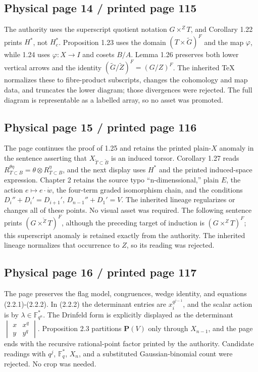 \documentclass[10pt]{article}
\begin{document}
\subsection*{Physical page 14 / printed page 115}

The authority uses the superscript quotient notation \(G\times^Z T\), and Corollary 1.22 prints \(H^*\), not \(H_c^*\). Proposition 1.23 uses the domain \((T\times\widetilde G)^F\) and the map \(\varphi\), while 1.24 uses \(\varphi:X\to I\) and cosets \(B/A\). Lemma 1.26 preserves both lower vertical arrows and the identity \((\widetilde G/\widetilde Z)^F=(G/Z)^F\). The inherited TeX normalizes these to fibre-product subscripts, changes the cohomology and map data, and truncates the lower diagram; those divergences were rejected. The full diagram is representable as a labelled array, so no asset was promoted.\par

\subsection*{Physical page 15 / printed page 116}

The page continues the proof of 1.25 and retains the printed plain-\(X\) anomaly in the sentence asserting that \(X_{\widetilde T\subset\widetilde B}\) is an induced torsor. Corollary 1.27 reads \(R_{T\subset B}^{\theta\eta}=\theta\otimes R_{T\subset B}^{\eta}\), and the next display uses \(H^*\) and the printed induced-space expression. Chapter 2 retains the source typo “n-dimenssional,” plain \(E\), the action \(e\mapsto e\cdot\dot w\), the four-term graded isomorphism chain, and the conditions \(D_i''+D_i'=D_{i+1}'\), \(D_{n-1}''+D_1'=V\). The inherited lineage regularizes or changes all of these points. No visual asset was required. The following sentence prints \((G\times^{\widetilde Z}T)^F\), although the preceding target of induction is \((G\times^ZT)^F\); this superscript anomaly is retained exactly from the authority. The inherited lineage normalizes that occurrence to \(Z\), so its reading was rejected.\par

\subsection*{Physical page 16 / printed page 117}

The page preserves the flag model, congruences, wedge identity, and equations (2.2.1)-(2.2.2). In (2.2.2) the determinant entries are \(x_i^{q^{j-1}}\), and the scalar action is by \(\lambda\in\mathbb F_{q^n}^*\). The Drinfeld form is explicitly displayed as the determinant \(\begin{vmatrix}x&x^q\\y&y^q\end{vmatrix}\). Proposition 2.3 partitions \(\mathbf P(V)\) only through \(X_{n-1}\), and the page ends with the recursive rational-point factor printed by the authority. Candidate readings with \(q^j\), \(\mathbb F_q^*\), \(X_n\), and a substituted Gaussian-binomial count were rejected. No crop was needed.\par
\end{document}
